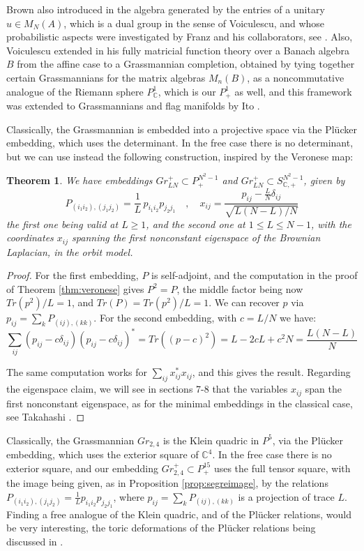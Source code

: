 \documentclass[11pt]{article}
\theoremstyle{plain}
\newtheorem{theorem}{Theorem}[section]
\begin{document}
\bigskip

Brown also introduced in \cite{bro} the algebra generated by the entries of a unitary $u\in M_N(A)$, which is a dual group in the sense of Voiculescu, and whose probabilistic aspects were investigated by Franz and his collaborators, see \cite{bcf}. Also, Voiculescu extended in \cite{voi} his fully matricial function theory over a Banach algebra $B$ from the affine case to a Grassmannian completion, obtained by tying together certain Grassmannians for the matrix algebras $M_n(B)$, as a noncommutative analogue of the Riemann sphere $P^1_\mathbb C$, which is our $P^1_+$ as well, and this framework was extended to Grassmannians and flag manifolds by Ito \cite{ito}.

\bigskip

Classically, the Grassmannian is embedded into a projective space via the Pl\"ucker embedding, which uses the determinant. In the free case there is no determinant, but we can use instead the following construction, inspired by the Veronese map:

\begin{theorem}
\label{thm:plucker}
We have embeddings $Gr^+_{LN}\subset P^{N^2-1}_+$ and $Gr^+_{LN}\subset S^{N^2-1}_{\mathbb C,+}$, given by
$$P_{(i_1i_2),(j_1j_2)}=\frac{1}{L}\,p_{i_1i_2}p_{j_2j_1}\quad,\quad
x_{ij}=\frac{p_{ij}-\frac{L}{N}\delta_{ij}}{\sqrt{L(N-L)/N}}$$
the first one being valid at $L\geq1$, and the second one at $1\leq L\leq N-1$, with the coordinates $x_{ij}$ spanning the first nonconstant eigenspace of the Brownian Laplacian, in the orbit model.
\end{theorem}

\begin{proof}
For the first embedding, $P$ is self-adjoint, and the computation in the proof of Theorem \ref{thm:veronese} gives $P^2=P$, the middle factor being now $Tr(p^2)/L=1$, and $Tr(P)=Tr(p^2)/L=1$. We can recover $p$ via $p_{ij}=\sum_kP_{(ij),(kk)}$. For the second embedding, with $c=L/N$ we have:
$$\sum_{ij}(p_{ij}-c\delta_{ij})(p_{ij}-c\delta_{ij})^*
=Tr((p-c)^2)
=L-2cL+c^2N
=\frac{L(N-L)}{N}$$

The same computation works for $\sum_{ij}x_{ij}^*x_{ij}$, and this gives the result. Regarding the eigenspace claim, we will see in sections 7-8 that the variables $x_{ij}$ span the first nonconstant eigenspace, as for the minimal embeddings in the classical case, see Takahashi \cite{tak}.
\end{proof}

Classically, the Grassmannian $Gr_{2,4}$ is the Klein quadric in $P^5$, via the Pl\"ucker embedding, which uses the exterior square of $\mathbb C^4$. In the free case there is no exterior square, and our embedding $Gr^+_{2,4}\subset P^{15}_+$ uses the full tensor square, with the image being given, as in Proposition \ref{prop:segreimage}, by the relations $P_{(i_1i_2),(j_1j_2)}=\frac{1}{L}p_{i_1i_2}p_{j_2j_1}$, where $p_{ij}=\sum_kP_{(ij),(kk)}$ is a projection of trace $L$. Finding a free analogue of the Klein quadric, and of the Pl\"ucker relations, would be very interesting, the toric deformations of the Pl\"ucker relations being discussed in \cite{cls}.
\end{document}
